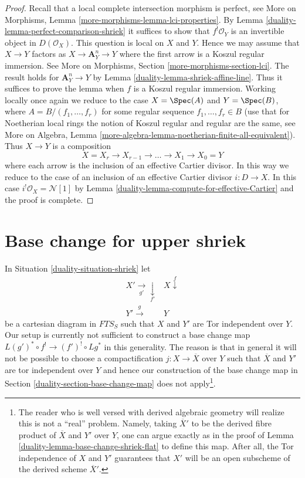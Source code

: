\begin{proof}

Recall that a local complete intersection morphism is perfect, see
More on Morphisms, Lemma \ref{more-morphisms-lemma-lci-properties}.
By Lemma \ref{duality-lemma-perfect-comparison-shriek} it suffices to show
that $f^!\mathcal{O}_Y$ is an invertible object in $D(\mathcal{O}_X)$.
This question is local on $X$ and $Y$. Hence we may assume that $X \to Y$
factors as $X \to \mathbf{A}^n_Y \to Y$ where the first arrow is a
Koszul regular immersion. See More on Morphisms, Section
\ref{more-morphisms-section-lci}.
The result holds for $\mathbf{A}^n_Y \to Y$
by Lemma \ref{duality-lemma-shriek-affine-line}. Thus it suffices to prove
the lemma when $f$ is a Koszul regular immersion.
Working locally once again we reduce to the case
$X = \Spec(A)$ and $Y = \Spec(B)$, where $A = B/(f_1, \ldots, f_r)$
for some regular sequence $f_1, \ldots, f_r \in B$
(use that for Noetherian local rings the notion of Koszul
regular and regular are the same, see
More on Algebra, Lemma
\ref{more-algebra-lemma-noetherian-finite-all-equivalent}).
Thus $X \to Y$ is a composition
$$
X = X_r \to X_{r - 1} \to \ldots \to X_1 \to X_0 = Y
$$
where each arrow is the inclusion of an effective Cartier divisor.
In this way we reduce to the case of an inclusion of an effective
Cartier divisor $i : D \to X$. In this case
$i^!\mathcal{O}_X = \mathcal{N}[1]$ by
Lemma \ref{duality-lemma-compute-for-effective-Cartier} and the proof is complete.
\end{proof}

\section{Base change for upper shriek}
\label{duality-section-base-change-shriek}
In Situation \ref{duality-situation-shriek} let
$$
\begin{array}{cc}X' \underset{g'}{\longrightarrow}\underset{f'}{\downarrow} & X \overset{f}{\downarrow} \\ Y' \overset{g}{\longrightarrow} & Y\end{array}
$$
be a cartesian diagram in $\textit{FTS}_S$ such that
$X$ and $Y'$ are Tor independent over $Y$. Our setup is currently
not sufficient to construct a base change map
$L(g')^* \circ f^! \to (f')^! \circ Lg^*$ in this generality.
The reason is that in general it will not be possible to choose
a compactification $j : X \to \overline{X}$ over $Y$ such that
$\overline{X}$ and $Y'$ are tor independent over $Y$ and hence
our construction of the base change map in
Section \ref{duality-section-base-change-map} does not apply\footnote{
The reader who is well versed with derived algebraic geometry
will realize this is not a ``real'' problem. Namely, taking
$\overline{X}'$ to be the derived fibre product of
$\overline{X}$ and $Y'$ over $Y$, one can argue exactly as in
the proof of Lemma \ref{duality-lemma-base-change-shriek-flat}
to define this map. After all, the Tor independence
of $X$ and $Y'$ guarantees that $X'$ will be an open subscheme
of the derived scheme $\overline{X}'$.}.

